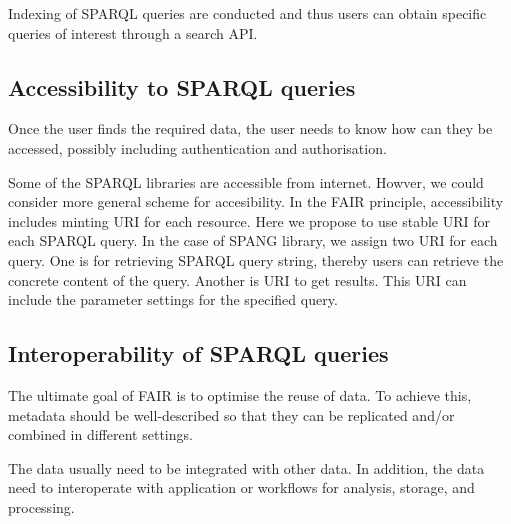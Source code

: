 \documentclass[runningheads]{llncs}
\begin{document}
Indexing of SPARQL queries are conducted and thus users can obtain specific queries of interest through a search API.

\subsection{Accessibility to SPARQL queries}
Once the user finds the required data, the user needs to know how can they be accessed, possibly including authentication and authorisation.

Some of the SPARQL libraries are accessible from internet. Howver, we could consider more general scheme for accesibility. In the FAIR principle, accessibility includes minting URI for each resource. Here we propose to use stable URI for each SPARQL query.
In the case of SPANG library, we assign two URI for each query. One is for retrieving SPARQL query string, thereby users can retrieve the concrete content of the query. Another is URI to get results. This URI can include the parameter settings for the specified query.

\subsection{Interoperability of SPARQL queries}
The ultimate goal of FAIR is to optimise the reuse of data. To achieve this, metadata should be well-described so that they can be replicated and/or combined in different settings.

The data usually need to be integrated with other data. In addition, the data need to interoperate with application or workflows for analysis, storage, and processing.
\end{document}
